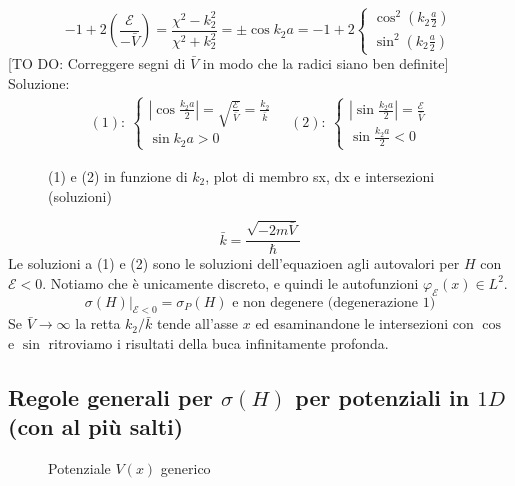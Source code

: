 \documentclass[../../FisicaTeorica.tex]{subfiles}
\begin{document}
\[
-1+2\left(\frac{\mathcal{E}}{-\bar{V}}\right)=\frac{\chi^2-k_2^2}{\chi^2+k_2^2}=\pm \cos k_2 a = -1+2\begin{cases}
\cos^2\left(k_2\frac{a}{2}\right)\\
\sin^2\left(k_2 \frac{a}{2}\right)
\end{cases}
\]
[TO DO: Correggere segni di $\bar{V}$ in modo che la radici siano ben definite]\\
Soluzione:
\begin{align*}
(1):\>
\begin{cases}
|\cos \frac{k_2 a}{2}| = \sqrt{\frac{\mathcal{E}}{\bar{V}}} = \frac{k_2}{\bar{k}}\\
\sin k_2 a >0
\end{cases} \quad (2):\
\begin{cases}
|\sin \frac{k_2 a}{2} | = \frac{\mathcal{E}}{\bar{V}}\\
\sin \frac{k_2 a}{2} < 0
\end{cases}
\end{align*}
\begin{figure}
\centering

\caption{(1) e (2) in funzione di $k_2$, plot di membro sx, dx e intersezioni (soluzioni)}
\end{figure}
\[
\bar{k}=\frac{\sqrt{-2m\bar{V}}}{\hbar}
\]
Le soluzioni a (1) e (2) sono le soluzioni dell'equazioen agli autovalori per $H$ con $\mathcal{E}<0$. Notiamo che è unicamente discreto, e quindi le autofunzioni $\varphi_\mathcal{E}(x)\in L^2$. 
\[
\sigma(H)\Big|_{\mathcal{E}<0}=\sigma_P(H) \text{ e non degenere (degenerazione $1$)}
\]
Se $\bar{V}\to\infty$ la retta $k_2/\bar{k}$ tende all'asse $x$ ed esaminandone le intersezioni con $\cos$ e $\sin$ ritroviamo i risultati della buca infinitamente profonda.\\

\subsection{Regole generali per $\sigma(H)$ per potenziali in $1D$ (con al più salti)}
\begin{figure}[H]
\centering

\caption{Potenziale $V(x)$ generico}
\end{figure}
\end{document}
